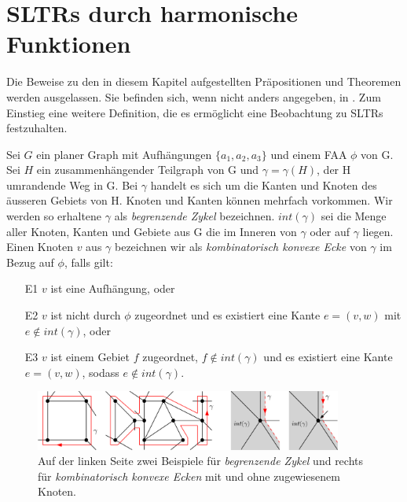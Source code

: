 \section{SLTRs durch harmonische Funktionen}\label{harmonic_approach}

Die Beweise zu den in diesem Kapitel aufgestellten Präpositionen und Theoremen werden ausgelassen. Sie befinden sich, wenn nicht anders angegeben, in \cite{af13} . Zum Einstieg eine weitere Definition, die es ermöglicht eine Beobachtung zu SLTRs festzuhalten.

\begin{definition}\label{def_ccc}
Sei $G$ ein planer Graph mit Aufhängungen $\{a_1,a_2,a_3\}$ und einem FAA $\phi$ von G. Sei $H$ ein zusammenhängender Teilgraph von G und $\gamma=\gamma(H)$, der H umrandende Weg in G. Bei $\gamma$ handelt es sich um die Kanten und Knoten des äusseren Gebiets von H. Knoten und Kanten können mehrfach vorkommen. Wir werden so erhaltene $\gamma$ als \textit{begrenzende Zykel} bezeichnen. $int(\gamma)$ sei die Menge aller Knoten, Kanten und Gebiete aus G die im Inneren von $\gamma$ oder auf $\gamma$ liegen. Einen Knoten $v$ aus $\gamma$ bezeichnen wir als \textit{kombinatorisch konvexe Ecke} von $\gamma$ im Bezug auf $\phi$, falls gilt:
\begin{itemize}
\item [E1] $v$ ist eine Aufhängung, oder
\item [E2] $v$ ist nicht durch $\phi$ zugeordnet und es existiert eine Kante $e = (v,w)$ mit $e \notin int(\gamma)$, oder
\item [E3] $v$ ist einem Gebiet $f$ zugeordnet, $f \notin int(\gamma)$ und es existiert eine Kante $e = (v,w)$, sodass $e \notin int(\gamma)$.
\end{itemize}

\end{definition}

\begin{figure}[h]
	\centering
  \includegraphics[width=0.9\textwidth]{corner_def.png}
  \caption{Auf der linken Seite zwei Beispiele für \textit{begrenzende Zykel} und rechts für \textit{kombinatorisch konvexe Ecken} mit und ohne zugewiesenem Knoten.}
\end{figure}

